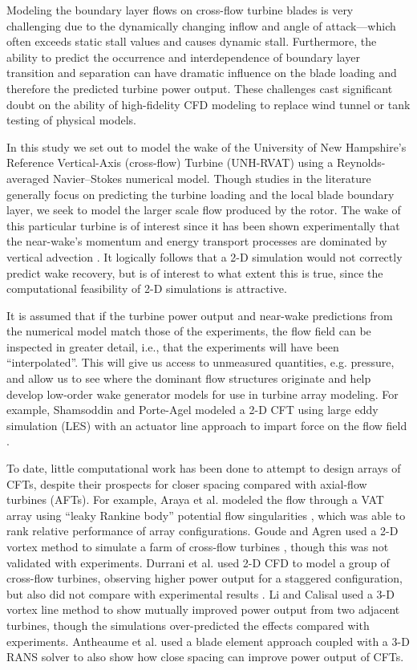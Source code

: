 \documentclass[aip,graphicx]{revtex4-1}
\begin{document}
Modeling the boundary layer flows on cross-flow turbine blades is very
challenging due to the dynamically changing inflow and angle of attack---which
often exceeds static stall values and causes dynamic stall. Furthermore, the
ability to predict the occurrence and interdependence of boundary layer
transition and separation can have dramatic influence on the blade loading and
therefore the predicted turbine power output. These challenges cast significant
doubt on the ability of high-fidelity CFD modeling to replace wind tunnel or
tank testing of physical models.


In this study we set out to model the wake of the University of New Hampshire's
Reference Vertical-Axis (cross-flow) Turbine (UNH-RVAT) using a
Reynolds-averaged Navier--Stokes numerical model. Though studies in the
literature generally focus on predicting the turbine loading and the local blade
boundary layer, we seek to model the larger scale flow produced by the rotor.
The wake of this particular turbine is of interest since it has been shown
experimentally that the near-wake's momentum and energy transport processes are
dominated by vertical advection \cite{Bachant2015-JoT}. It logically follows
that a 2-D simulation would not correctly predict wake recovery, but is of
interest to what extent this is true, since the computational feasibility of 2-D
simulations is attractive.

It is assumed that if the turbine power output and near-wake predictions from
the numerical model match those of the experiments, the flow field can be
inspected in greater detail, i.e., that the experiments will have been
``interpolated''. This will give us access to unmeasured quantities, e.g.
pressure, and allow us to see where the dominant flow structures originate and
help develop low-order wake generator models for use in turbine array modeling.
For example, Shamsoddin and Porte-Agel modeled a 2-D CFT using large eddy
simulation (LES) with an actuator line approach to impart force on the flow
field \cite{Shamsoddin2014}.

To date, little computational work has been done to attempt to design arrays of
CFTs, despite their prospects for closer spacing compared with axial-flow
turbines (AFTs). For example, Araya et al. modeled the flow through a VAT array
using ``leaky Rankine body'' potential flow singularities \cite{Araya2014},
which was able to rank relative performance of array configurations. Goude and
Agren used a 2-D vortex method to simulate a farm of cross-flow turbines
\cite{Goude2010}, though this was not validated with experiments. Durrani et al.
used 2-D CFD to model a group of cross-flow turbines, observing higher power
output for a staggered configuration, but also did not compare with experimental
results \cite{Durrani2011}. Li and Calisal \cite{Li2010} used a 3-D vortex line
method to show mutually improved power output from two adjacent turbines, though
the simulations over-predicted the effects compared with experiments. Antheaume
et al. \cite{Antheaume2008} used a blade element approach coupled with a 3-D
RANS solver to also show how close spacing can improve power output of CFTs.
\end{document}
